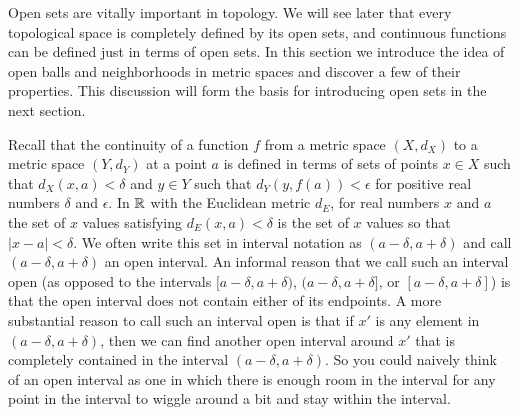\label{sec:open_balls}


\vspace*{-17 pt}

\vspace*{13 pt}

Open sets are vitally important in topology. We will see later that every topological space is completely defined by its open sets, and continuous functions can be defined just in terms of open sets. In this section we introduce the idea of open balls and neighborhoods in metric spaces and discover a few of their properties. This discussion will form the basis for introducing open sets in the next section.

Recall that the continuity of a function $f$ from a metric space $(X, d_X)$ to a metric space $(Y, d_Y)$ at a point $a$ is defined in terms of sets of points $x \in X$ such that $d_X(x,a) < \delta$ and $y \in Y$ such that $d_Y(y, f(a)) < \epsilon$ for positive real numbers $\delta$ and $\epsilon$. In $\mathbb{R}$ with the Euclidean metric $d_E$, for real numbers $x$ and $a$ the set of $x$ values satisfying $d_E(x,a) < \delta$ is the set of $x$ values so that $| x-a | < \delta$. We often write this set in interval notation as $(a-\delta, a+\delta)$ and call $(a-\delta, a+\delta)$ an open interval. An informal reason that we call such an interval open (as opposed to the intervals $[a-\delta, a+\delta)$, $(a-\delta, a+\delta]$, or $[a-\delta, a+\delta]$) is that the open interval does not contain either of its endpoints. A more substantial reason to call such an interval open is that if $x'$ is any element in $(a-\delta, a+\delta)$, then we can find another open interval around $x'$ that is completely contained in the interval $(a-\delta, a+\delta)$. So you could naively think of an open interval as one in which there is enough room in the interval for any point in the interval to wiggle around a bit and stay within the interval. 

